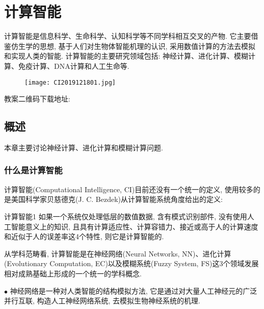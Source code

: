 \chapter{计算智能}
\begin{tcolorbox}[colback=white!50,colframe=orange!50,title=计算智能]
计算智能是信息科学、生命科学、认知科学等不同学科相互交叉的产物. 它主要借鉴仿生学的思想, 基于人们对生物体智能机理的认识, 采用数值计算的方法去模拟和实现人类的智能.
计算智能的主要研究领域包括: 神经计算、进化计算、模糊计算、免疫计算、DNA计算和人工生命等.
\hfill
\end{tcolorbox}
\begin{figure}[H]
\centering
\texttt{[image: CI2019121801.jpg]}
\label{CI2019121801}
\end{figure}
教案二维码下载地址: 
\section{概述}
本章主要讨论神经计算、进化计算和模糊计算问题.
\subsection{什么是计算智能}
计算智能(Computational Intelligence, CI)目前还没有一个统一的定义, 使用较多的是美国科学家贝慈德克(J. C. Bezdek)从计算智能系统角度给出的定义:
\begin{mydef}{计算智能}{1}
    如果一个系统仅处理低层的数值数据, 含有模式识别部件, 没有使用人工智能意义上的知识, 且具有计算适应性、计算容错力、接近或高于人的计算速度和近似于人的误差率这4个特性, 则它是计算智能的.
\end{mydef}
\begin{remark}
    从学科范畴看, 计算智能是在神经网络(Neural Networks, NN)、进化计算(Evolutionary Computation, EC)以及模糊系统(Fuzzy System, FS)这3个领域发展相对成熟基础上形成的一个统一的学科概念.
\end{remark}

$\bullet$ 神经网络是一种对人类智能的结构模拟方法, 它是通过对大量人工神经元的广泛并行互联, 构造人工神经网络系统, 去模拟生物神经系统的机理.

